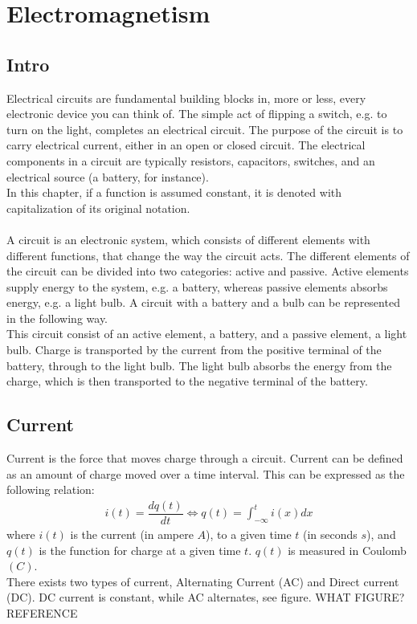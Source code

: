 \chapter{Electromagnetism}
\section{Intro}
Electrical circuits are fundamental building blocks in, more or less, every electronic device you can think of. The simple act of flipping a switch, e.g. to turn on the light, completes an electrical circuit. The purpose of the circuit is to carry electrical current, either in an open or closed circuit. The electrical components in a circuit are typically resistors, capacitors,  switches, and an electrical 	source (a battery, for instance).
\\ 
In this chapter, if a function is assumed constant, it is denoted with capitalization of its original notation. 
\\ 
\\
A circuit is an electronic system, which consists of different elements with different functions, that change the way the circuit acts. The different elements of the circuit can be divided into two categories: active and passive. Active elements supply energy to the system, e.g. a battery, whereas passive elements absorbs energy, e.g. a light bulb. A circuit with a battery and a bulb can be represented in the following way. 
\\ This circuit consist of an active element, a battery, and a passive element, a light bulb. Charge is transported by the current from the positive terminal of the battery, through to the light bulb. The light bulb absorbs the energy from the charge, which is then transported to the negative terminal of the battery.
\\
\section{Current}
Current is the force that moves charge through a circuit. Current can be defined as an amount of charge moved over a time interval. This can be expressed as the following relation:
\begin{align}
i(t)=\dfrac{dq(t)}{dt} \Leftrightarrow q(t)=\int_{-\infty}^{t}i(x)dx
\end{align}
where $i(t)$ is the current (in ampere $A$), to a given time $t$ (in seconds $s$), and $q(t)$ is the function for charge at a given time $t$. $q(t)$ is measured in Coulomb$(C)$.
\\
There exists two types of current, Alternating Current (AC) and Direct current (DC). DC current is constant, while AC alternates, see figure. WHAT FIGURE? REFERENCE
\\
